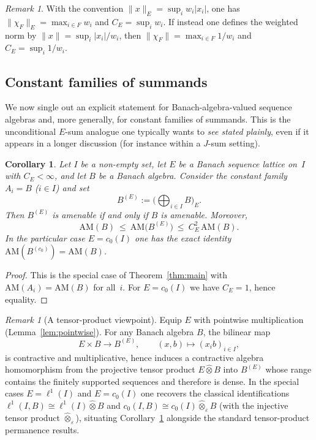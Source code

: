 \documentclass[reqno]{amsart}
\theoremstyle{plain}
\newtheorem{corollary}[theorem]{Corollary}
\theoremstyle{definition}
\theoremstyle{remark}
\newtheorem{remark}[theorem]{Remark}
\newcommand{\AM}{\mathrm{AM}}
\newcommand{\hatot}{\widehat{\otimes}}
\renewcommand{\le}{\leqslant}
\begin{document}
\begin{remark}\label{rem:weight-convention}
With the convention $\|x\|_E=\sup_i w_i|x_i|$, one has $\|\chi_F\|_E=\max_{i\in F} w_i$ and
$C_E=\sup_i w_i$.  If instead one defines the weighted norm by
$\|x\|=\sup_i |x_i|/w_i$, then $\|\chi_F\|=\max_{i\in F} 1/w_i$ and $C_E=\sup_i 1/w_i$.
\end{remark}


\subsection{Constant families of summands}

We now single out an explicit statement for Banach-algebra-valued sequence algebras and, more generally,
for constant families of summands.  This is the unconditional $E$-sum analogue one typically wants to
\emph{see stated plainly}, even if it appears in a longer discussion (for instance within a $J$-sum setting).

\begin{corollary}\label{cor:Piszczek}
Let $I$ be a non-empty set, let $E$ be a Banach sequence lattice on~$I$ with $C_E<\infty$, and let $B$ be a Banach algebra.
Consider the constant family $A_i=B$ ($i\in I$) and set
\[
B^{(E)}:=\Big(\bigoplus_{i\in I} B\Big)_{\!E}.
\]
Then $B^{(E)}$ is amenable if and only if $B$ is amenable. Moreover,
\[
\AM(B)\ \le\ \AM\bigl(B^{(E)}\bigr)\ \le\ C_E^2\,\AM(B).
\]
In the particular case $E=c_0(I)$ one has the exact identity $\AM(B^{(c_0)})=\AM(B)$.
\end{corollary}

\begin{proof}
This is the special case of Theorem~\ref{thm:main} with $\AM(A_i)=\AM(B)$ for all~$i$.
For $E=c_0(I)$ we have $C_E=1$, hence equality.
\end{proof}

\begin{remark}[A tensor-product viewpoint]\label{rem:tensor-viewpoint}
Equip $E$ with pointwise multiplication (Lemma~\ref{lem:pointwise}).
For any Banach algebra $B$, the bilinear map
\[
E\times B\longrightarrow B^{(E)},\qquad (x,b)\longmapsto (x_i b)_{i\in I},
\]
is contractive and multiplicative, hence induces a contractive algebra homomorphism
from the projective tensor product $E\hatot B$ into $B^{(E)}$ whose range contains the
finitely supported sequences and therefore is dense.
In the special cases $E=\ell^1(I)$ and $E=c_0(I)$ one recovers the classical identifications
$\ell^1(I,B)\cong \ell^1(I)\hatot B$ and $c_0(I,B)\cong c_0(I)\hatot_\varepsilon B$
(with the injective tensor product $\hatot_\varepsilon$), situating
Corollary~\ref{cor:Piszczek} alongside the standard tensor-product permanence results.
\end{remark}
\end{document}
